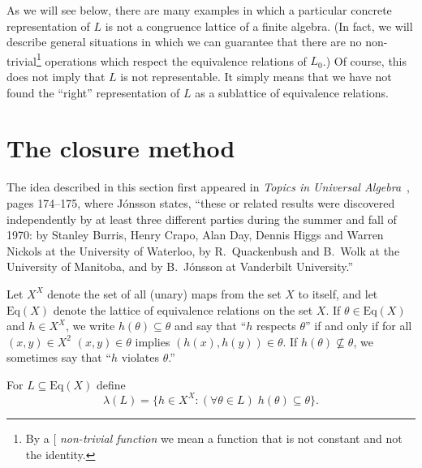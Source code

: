 \documentclass[cm,dissertation,actual,final]{uhthesis}
\theoremstyle{plain}
\theoremstyle{definition}
\theoremstyle{remark}
\numberwithin{theorem}{section}
\numberwithin{claim}{chapter}
\numberwithin{equation}{section}
\numberwithin{conjecture}{chapter}
\newcommand{\<}{\ensuremath{\langle}}
\renewcommand{\>}{\ensuremath{\rangle}}
\newcommand{\Eq}{\ensuremath{\mathrm{Eq}}}
\newcommand{\0}{\ensuremath{\mathbf{0}}}
\newcommand{\1}{\ensuremath{\mathbf{1}}}
\newcommand{\2}{\ensuremath{\mathbf{2}}}
\newcommand{\3}{\ensuremath{\mathbf{3}}}
\newcommand{\4}{\ensuremath{\mathbf{4}}}
\newcommand{\5}{\ensuremath{\mathbf{5}}}
\newcommand{\indexit}[1]{\index{#1|textit}}
\def\defn#1{\gdef\defnstring{#1}%
  \xdef\dodefnii{{\noexpand\em
       \defnstring}\noexpand\indexit{\defnstring}\noexpand\makeatother}%
  \futurelet\nextthing\dodefn}
\def\dodefn{%
  \ifx\nextthing[\let\next=\dodefni
    \else\let\next=\dodefnii\fi
  \makeatletter
  \next}
\def\dodefni[#1]{%
  {\em\defnstring}%
  \indexit{#1}%
  \makeatother}
\begin{document}
As we will see below, there are many examples in which a particular concrete
representation of $L$ is not a congruence lattice of a finite algebra.  (In fact,
we will describe general situations in which we can guarantee that there are no
non-trivial\footnote{By a 
\defn{non-trivial function} we mean a function that is
  not constant and not the identity.} operations which respect the equivalence
relations of $L_0$.) 
Of course, this does not imply that $L$ is not representable.  It
simply means that we have not found the ``right'' representation of $L$ as a
sublattice of equivalence relations.

\section{The closure method}
\label{sec:closure-method}
The idea described in this section
first appeared in \emph{Topics in Universal Algebra}~\cite{Jonsson:1972}, pages
174--175, where J\'onsson states, ``these or related results were discovered
independently by at least three different parties during the summer and fall of
1970: by Stanley Burris, Henry Crapo, Alan Day, Dennis Higgs and Warren Nickols
at the University of Waterloo, by R.~Quackenbush and B.~Wolk at the University
of Manitoba, and by B.~J\'{o}nsson at Vanderbilt University.''

Let $X^X$ denote the set of all (unary) maps from the set $X$ to itself, and let 
$\Eq(X)$ denote the lattice of equivalence relations on the set $X$.  If $\theta
\in \Eq(X)$ and $h\in X^X$, we write $h(\theta) \subseteq \theta$ and say
that ``$h$ respects $\theta$'' if and only if for all $(x,y)\in X^2$ $(x,y)\in
\theta$ implies 
$(h(x),h(y)) \in \theta$.  If $h(\theta) \nsubseteq \theta$, we sometimes say
that ``$h$ violates $\theta$.''

For $L\subseteq \Eq(X)$ define
      \[
      \lambda(L) = \{h\in X^X: (\forall \theta \in L) \; h(\theta) \subseteq \theta \}.
      \]
\end{document}
